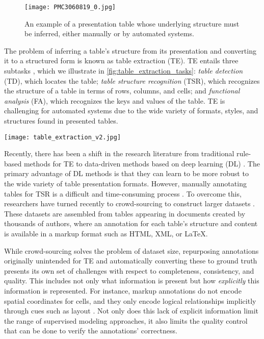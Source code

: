 \documentclass[10pt,twocolumn,letterpaper]{article}
\begin{document}
\begin{figure}[]
    \centering
    \texttt{[image: PMC3060819\_0.jpg]}
    \caption{An example of a presentation table whose underlying structure must be inferred, either manually or by automated systems.}
    \label{fig:example1}
\end{figure}

The problem of inferring a table's structure from its presentation and converting it to a structured form is known as table extraction (TE).
TE entails three subtasks \cite{gobel2013icdar}, which we illustrate in \cref{fig:table_extraction_tasks}: \textit{table detection} (TD), which locates the table; \textit{table structure recognition} (TSR), which recognizes the structure of a table in terms of rows, columns, and cells; and \textit{functional analysis} (FA), which recognizes the keys and values of the table.
TE is challenging for automated systems \cite{schreiber2017deepdesrt, zhong2019image, li2020tablebank, paliwal2019tablenet} due to the wide variety of formats, styles, and structures found in presented tables.

\begin{figure*}[]
  \centering
  \texttt{[image: table\_extraction\_v2.jpg]}
  \caption{Illustration of the three subtasks of table extraction addressed by the PubTables-1M dataset.}
  \label{fig:table_extraction_tasks}
\end{figure*}

Recently, there has been a shift in the research literature from traditional rule-based methods \cite{gatterbauer2007towards, oro2009trex, shigarov2015table} for TE to data-driven methods based on deep learning (DL) \cite{schreiber2017deepdesrt, prasad2020cascadetabnet, zheng2021global}.
The primary advantage of DL methods is that they can learn to be more robust to the wide variety of table presentation formats.
However, manually annotating tables for TSR is a difficult and time-consuming process \cite{hu2001table}.
To overcome this, researchers have turned recently to crowd-sourcing to construct larger datasets \cite{li2020tablebank, zhong2019image, zheng2021global}.
These datasets are assembled from tables appearing in documents created by thousands of authors, where an annotation for each table's structure and content is available in a markup format such as HTML, XML, or LaTeX.

While crowd-sourcing solves the problem of dataset size, repurposing annotations originally unintended for TE and automatically converting these to ground truth presents its own set of challenges with respect to completeness, consistency, and quality.
This includes not only what information is present but how \emph{explicitly} this information is represented.
For instance, markup annotations do not encode spatial coordinates for cells, and they only encode logical relationships implicitly through cues such as layout \cite{tengli2004learning}.
Not only does this lack of explicit information limit the range of supervised modeling approaches, it also limits the quality control that can be done to verify the annotations' correctness.
\end{document}
